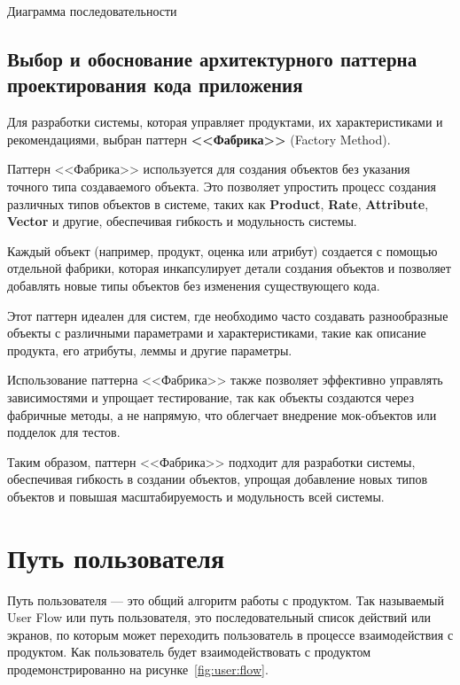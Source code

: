 \begin{image}
	\caption{Диаграмма последовательности}
	\label{fig:sequence}
\end{image}


\subsection{Выбор и обоснование архитектурного
	паттерна проектирования кода приложения}

Для разработки системы, которая управляет продуктами, их характеристиками и рекомендациями, выбран паттерн \textbf{<<Фабрика>>} (Factory Method).\par
Паттерн <<Фабрика>> используется для создания объектов без указания точного типа создаваемого объекта. Это позволяет упростить процесс создания различных типов объектов в системе, таких как \textbf{Product}, \textbf{Rate}, \textbf{Attribute}, \textbf{Vector} и другие, обеспечивая гибкость и модульность системы.\par
Каждый объект (например, продукт, оценка или атрибут) создается с помощью отдельной фабрики, которая инкапсулирует детали создания объектов и позволяет добавлять новые типы объектов без изменения существующего кода.\par
Этот паттерн идеален для систем, где необходимо часто создавать разнообразные объекты с различными параметрами и характеристиками, такие как описание продукта, его атрибуты, леммы и другие параметры.\par
Использование паттерна <<Фабрика>> также позволяет эффективно управлять зависимостями и упрощает тестирование, так как объекты создаются через фабричные методы, а не напрямую, что облегчает внедрение мок-объектов или подделок для тестов.\par
Таким образом, паттерн <<Фабрика>> подходит для разработки системы, обеспечивая гибкость в создании объектов, упрощая добавление новых типов объектов и повышая масштабируемость и модульность всей системы.

\clearpage  %

\section{Путь пользователя}

Путь пользователя --- это общий алгоритм работы с продуктом. Так
называемый User Flow или путь пользователя, это последовательный
список действий или экранов, по которым может переходить
пользователь в процессе взаимодействия с продуктом.
Как пользователь будет взаимодействовать с продуктом
продемонстрированно на рисунке~\ref{fig:user:flow}.

